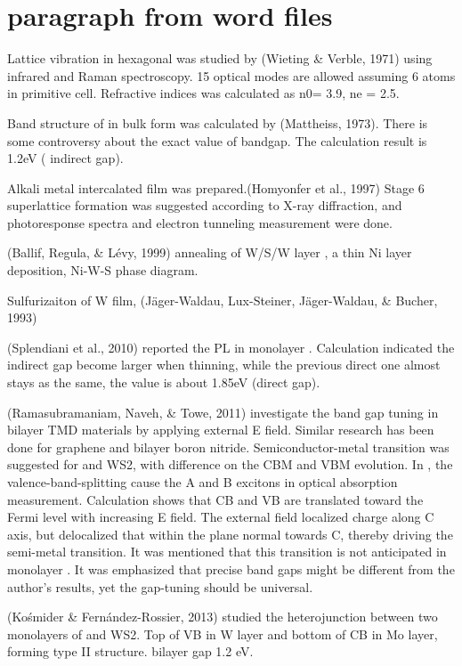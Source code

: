\section{paragraph from word files}

Lattice vibration in hexagonal  was studied by (Wieting & Verble, 1971) using infrared and Raman spectroscopy. 15 optical modes are allowed assuming 6 atoms in primitive cell. Refractive indices was calculated as n0= 3.9, ne = 2.5. \cite{Wieting1971}

Band structure  of  in bulk form was calculated by (Mattheiss, 1973). There is some controversy about the exact value of bandgap. The calculation result is 1.2eV ( indirect gap).\cite{Mattheiss1973}

Alkali metal intercalated  film was prepared.(Homyonfer et al., 1997) Stage 6 superlattice formation was suggested according to X-ray diffraction, and photoresponse spectra and electron tunneling measurement were done.

(Ballif, Regula, & Lévy, 1999) annealing of W/S/W layer , a thin Ni layer deposition, Ni-W-S phase diagram. 

Sulfurizaiton of W film, (Jäger-Waldau, Lux-Steiner, Jäger-Waldau, & Bucher, 1993) 

(Splendiani et al., 2010) reported the PL in monolayer .  Calculation indicated the indirect gap become larger when thinning, while the previous direct one almost stays as the same, the value is about 1.85eV (direct gap).\cite{Splendiani2010}

(Ramasubramaniam, Naveh, & Towe, 2011) investigate the band gap tuning in bilayer TMD materials by applying external E field. Similar research has been done for graphene and bilayer boron nitride. Semiconductor-metal transition was suggested for  and WS2, with difference on the CBM and VBM evolution. In , the valence-band-splitting cause the A and B excitons in optical absorption measurement. Calculation shows that CB and VB are translated toward the Fermi level with increasing E field.  The external field localized charge along C axis, but delocalized that within the plane normal towards C, thereby driving the semi-metal transition. It was mentioned that this transition is not anticipated in monolayer . It was emphasized that precise band gaps might be different from the author’s results, yet the gap-tuning should be universal.

(Kośmider & Fernández-Rossier, 2013) studied the heterojunction between two monolayers of  and WS2. Top of VB in W layer and bottom of CB in Mo layer, forming type II structure. bilayer gap 1.2 eV.

